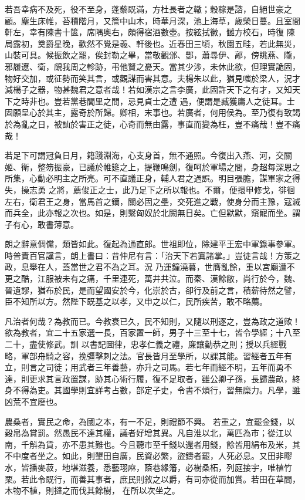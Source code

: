\begin{pinyinscope}
 若吾幸病不及死，役不至身，蓬藜既滿，方杜長者之轍；穀稼是諮，自絕世豪之顧。塵生床帷，苔積階月，又簷中山木，時華月深，池上海草，歲榮日蔓。且室間軒左，幸有陳書十篋，席隅奧右，頗得宿酒數壺。按絃拭徽，讎方校石，時復
 陳局露初，奠爵星晚，歡然不覺是羲、軒後也。近春田三頃，秋園五畦，若此無災，山裝可具。候振飲之罷，俟封勒之畢，當敬觀邠、酆，蕭尋伊、鄗，傍眺燕、隴，邪履遼、衛，覛我周之軫跡，弔他賢之憂天。當其少涉，未休此欲，但理實詭固，物好交加，或征勢而笑其言，或觀謀而害其意。夫楊朱以此，猶見嗤於梁人，況才減楊子之器，物甚魏君之意者哉！若如漢宗之言李廣，此固許天下之有才，又知天下之時非也。豈若黨巷閭里之間，忌見貞士之遭
 遇，便謂是臧獲庸人之徒耳。士固願呈心於其主，露奇於所歸。卿相，末事也。若廣者，何用侯為。至乃復有致謁於為亂之日，被訕於害正之徒，心奇而無由露，事直而變為枉，豈不痛哉！豈不痛哉！



 若足下可謂冠負日月，籍踐淵海，心支身首，無不通照。今復出入燕、河，交關姬、衛，整笏振豪，已議於帷筵之上，提鞭鳴劍，復呵於軍場之間，身超每深恩之所集，心動必明主之所亮。可不直議正身，輔人君之過誤。明目張膽，謀軍家之得失，操志勇
 之將，薦俊正之士，此乃足下之所以報也。不爾，便擐甲修戈，徘徊左右，衛君王之身，當馬首之鏑，關必固之壘，交死進之戰，使身分而主豫，寇滅而兵全，此亦報之次也。如是，則繫匈奴於北闕無日矣。亡但默默，窺寵而坐。謂子有心，敢書薄意。



 朗之辭意倜儻，類皆如此。復起為通直郎。世祖即位，除建平王宏中軍錄事參軍。時普責百官讜言，朗上書曰：昔仲尼有言：「治天下若寘諸掌。」豈徒言哉！方策之政，息舉在人，蓋當世之君不為之耳。況
 乃運鐘澆暮，世膺亂餘，重以宮廟遭不更之酷，江服被未有之痛，千里連死，萬井共泣。而秦、漢餘敝，尚行於今，魏、晉遺謬，猶布於民，是而望國安於今，化崇於古，卻行及前之言，積薪待然之譬，臣不知所以方。然陛下既基之以孝，又申之以仁，民所疾苦，敢不略薦。



 凡治者何哉？為教而已。今教衰已久，民不知則，又隨以刑逐之，豈為政之道歟！欲為教者，宜二十五家選一長，百家置一師，男子十三至十七，皆令學經；十八至二十，盡使修武。訓
 以書記圖律，忠孝仁義之禮，廉讓勤恭之則；授以兵經戰略，軍部舟騎之容，挽彊擊刺之法。官長皆月至學所，以課其能。習經者五年有立，則言之司徒；用武者三年善藝，亦升之司馬。若七年而經不明，五年而勇不達，則更求其言政置謀，跡其心術行履，復不足取者，雖公卿子孫，長歸農畝，終身不得為吏。其國學則宜詳考占數，部定子史，令書不煩行，習無糜力。凡學，雖凶荒不宜廢也。



 農桑者，實民之命，為國之本，有一不足，則禮節不興。
 若重之，宜罷金錢，以穀帛為賞罰。然愚民不達其權，議者好增其異。凡自淮以北，萬匹為市；從江以南，千斛為貨，亦不患其難也。今且聽市至千錢以還者用錢，餘皆用絹布及米，其不中度者坐之。如此，則墾田自廣，民資必繁，盜鑄者罷，人死必息。又田非疁水，皆播麥菽，地堪滋養，悉藝珝麻，蔭巷緣籓，必樹桑柘，列庭接宇，唯植竹栗。若此令既行，而善其事者，庶民則敘之以爵，有司亦從而加賞。若田在草間，木物不植，則撻之而伐其餘樹，
 在所以次坐之。




\end{pinyinscope}
